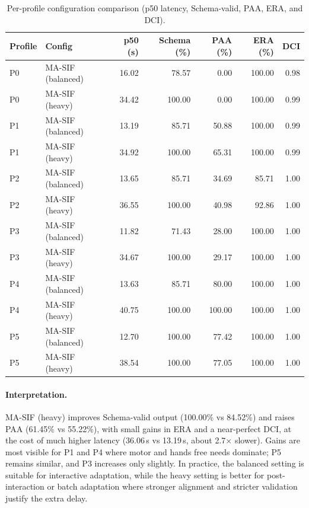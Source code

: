 \documentclass[openany]{book}
\begin{document}
\begin{table}[ht]
\centering
\caption{Per-profile configuration comparison (p50 latency, Schema-valid, PAA, ERA, and DCI).}
\label{tab:cfg-compare-profiles}
\begin{tabular}{l l r r r r r}
\toprule
\textbf{Profile} & \textbf{Config} & \textbf{p50 (s)} & \textbf{Schema (\%)} & \textbf{PAA (\%)} & \textbf{ERA (\%)} & \textbf{DCI} \\
\midrule
P0 & MA-SIF (balanced) & 16.02 & 78.57 & 0.00  & 100.00 & 0.98 \\
P0 & MA-SIF (heavy)    & 34.42 & 100.00 & 0.00  & 100.00 & 0.99 \\
P1 & MA-SIF (balanced) & 13.19 & 85.71  & 50.88 & 100.00 & 0.99 \\
P1 & MA-SIF (heavy)    & 34.92 & 100.00 & 65.31 & 100.00 & 0.99 \\
P2 & MA-SIF (balanced) & 13.65 & 85.71  & 34.69 & 85.71  & 1.00 \\
P2 & MA-SIF (heavy)    & 36.55 & 100.00 & 40.98 & 92.86  & 1.00 \\
P3 & MA-SIF (balanced) & 11.82 & 71.43  & 28.00 & 100.00 & 1.00 \\
P3 & MA-SIF (heavy)    & 34.67 & 100.00 & 29.17 & 100.00 & 1.00 \\
P4 & MA-SIF (balanced) & 13.63 & 85.71  & 80.00 & 100.00 & 1.00 \\
P4 & MA-SIF (heavy)    & 40.75 & 100.00 & 100.00& 100.00 & 1.00 \\
P5 & MA-SIF (balanced) & 12.70 & 100.00 & 77.42 & 100.00 & 1.00 \\
P5 & MA-SIF (heavy)    & 38.54 & 100.00 & 77.05 & 100.00 & 1.00 \\
\bottomrule
\end{tabular}
\end{table}

\paragraph{Interpretation.}
MA-SIF (heavy) improves Schema-valid output (100.00\% vs 84.52\%) and raises PAA (61.45\% vs 55.22\%), with small gains in ERA and a near-perfect DCI, at the cost of much higher latency (36.06\,s vs 13.19\,s, about 2.7$\times$ slower). Gains are most visible for P1 and P4 where motor and hands free needs dominate; P5 remains similar, and P3 increases only slightly. In practice, the balanced setting is suitable for interactive adaptation, while the heavy setting is better for post-interaction or batch adaptation where stronger alignment and stricter validation justify the extra delay.
\end{document}
